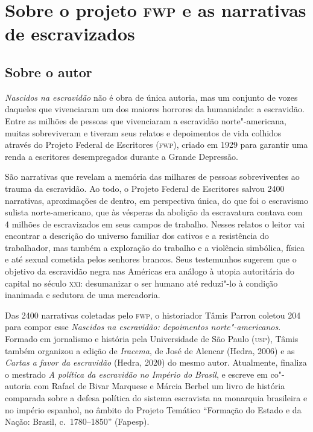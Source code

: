\chapter{Sobre o projeto \textsc{fwp} e as narrativas de escravizados}

\section{Sobre o autor}

\noindent\textit{Nascidos na escravidão} não é obra de única autoria,
mas um conjunto de vozes daqueles que vivenciaram um dos maiores horrores da humanidade:
a escravidão. Entre as milhões de pessoas que vivenciaram a escravidão norte"-americana, 
muitas sobreviveram e tiveram seus relatos e depoimentos de vida colhidos através do
Projeto Federal de Escritores (\textsc{fwp}), criado em 1929 para garantir uma renda a escritores desempregados durante a Grande Depressão.

São narrativas que revelam a memória das milhares de pessoas sobreviventes ao trauma da escravidão. Ao todo, o Projeto Federal de Escritores salvou 2400 narrativas, aproximações de dentro, em perspectiva única, do que foi o escravismo sulista norte-americano, que às vésperas da abolição da escravatura contava com 4 milhões de escravizados em seus campos de trabalho. Nesses relatos o leitor vai encontrar a descrição do universo familiar dos cativos e a resistência do trabalhador, mas também a exploração do trabalho e a violência simbólica, física e até sexual cometida pelos senhores brancos. Seus testemunhos sugerem que o objetivo da escravidão negra nas Américas era análogo à utopia autoritária do capital no século \textsc{xxi}: desumanizar o ser humano até reduzi"-lo à condição inanimada e sedutora de uma mercadoria.

Das 2400 narrativas coletadas pelo \textsc{fwp}, o historiador Tâmis Parron coletou 204 para compor esse \textit{Nascidos na escravidão: depoimentos norte"-americanos}.
Formado em jornalismo e história pela Universidade de São
Paulo (\textsc{usp}), Tâmis também organizou a edição de \textit{Iracema}, de José de Alencar
(Hedra, 2006) e as \textit{Cartas a favor da escravidão} (Hedra, 2020) do mesmo autor. Atualmente, finaliza o mestrado \textit{A política da escravidão
no Império do Brasil}, e escreve em co"-autoria com Rafael de Bivar Marquese e
Márcia Berbel um livro de história comparada sobre a defesa política do sistema
escravista na monarquia brasileira e no império espanhol, no âmbito do Projeto
Temático ``Formação do Estado e da Nação: Brasil, c.~1780--1850'' (Fapesp).



